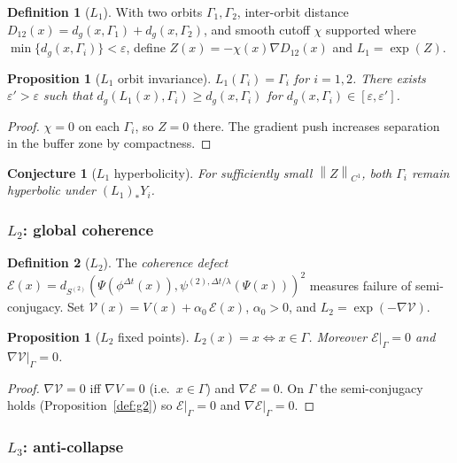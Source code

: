 \documentclass[12pt, oneside]{book}
\theoremstyle{plain}
\newtheorem{proposition}[theorem]{Proposition}
\newtheorem{conjecture}[theorem]{Conjecture}
\theoremstyle{definition}
\newtheorem{definition}{Definition}[section]
\theoremstyle{remark}
\newcommand{\Orb}{\Gamma}
\newcommand{\cV}{\mathcal{V}}
\newcommand{\eps}{\varepsilon}
\newcommand{\dg}{d_g}
\newcommand{\norm}[1]{\left\|#1\right\|}
\begin{document}
\begin{definition}[$L_1$]\label{def:L1}
With two orbits $\Orb_1,\Orb_2$, inter-orbit distance
$D_{12}(x)=\dg(x,\Orb_1)+\dg(x,\Orb_2)$, and smooth cutoff
$\chi$ supported where $\min\{\dg(x,\Orb_i)\}<\eps$, define
$Z(x)=-\chi(x)\nabla D_{12}(x)$ and $L_1=\exp(Z)$.
\end{definition}

\begin{proposition}[$L_1$ orbit invariance]\label{prop:L1}
$L_1(\Orb_i)=\Orb_i$ for $i=1,2$. There exists $\eps'>\eps$ such
that $\dg(L_1(x),\Orb_i)\ge\dg(x,\Orb_i)$ for
$\dg(x,\Orb_i)\in[\eps,\eps']$.
\end{proposition}
\begin{proof}
$\chi=0$ on each $\Orb_i$, so $Z=0$ there. The gradient push
increases separation in the buffer zone by compactness.
\end{proof}

\begin{conjecture}[$L_1$ hyperbolicity]\label{conj:L1}
For sufficiently small $\norm{Z}_{C^1}$, both $\Orb_i$ remain
hyperbolic under $(L_1)_*Y_i$.
\end{conjecture}

\subsubsection{\texorpdfstring{$L_2$}{L2}: global coherence}

\begin{definition}[$L_2$]\label{def:L2}
The \emph{coherence defect}
$\mathcal{E}(x)=d_{S^{(2)}}(\Psi(\phi^{\Delta t}(x)),
\psi^{(2),\Delta t/\lambda}(\Psi(x)))^2$ measures failure of
semi-conjugacy. Set $\cV(x)=V(x)+\alpha_0\,\mathcal{E}(x)$,
$\alpha_0>0$, and $L_2=\exp(-\nabla\cV)$.
\end{definition}

\begin{proposition}[$L_2$ fixed points]\label{prop:L2}
$L_2(x)=x\iff x\in\Orb$. Moreover $\mathcal{E}|_{\Orb}=0$ and
$\nabla\cV|_{\Orb}=0$.
\end{proposition}
\begin{proof}
$\nabla\cV=0$ iff $\nabla V=0$ (i.e.\ $x\in\Orb$) and
$\nabla\mathcal{E}=0$. On $\Orb$ the semi-conjugacy holds
(Proposition~\ref{def:g2}) so $\mathcal{E}|_{\Orb}=0$ and
$\nabla\mathcal{E}|_{\Orb}=0$.
\end{proof}

\subsubsection{\texorpdfstring{$L_3$}{L3}: anti-collapse}
\end{document}
